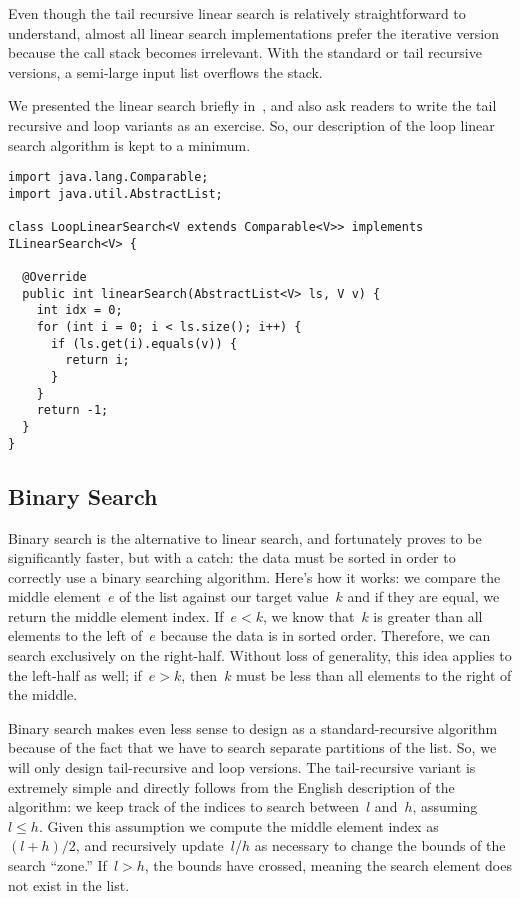 Even though the tail recursive linear search is relatively straightforward to understand, almost all linear search implementations prefer the iterative version because the call stack becomes irrelevant.
With the standard or tail recursive versions, a semi-large input list overflows the stack.

We presented the linear search briefly in~, and also ask readers to write the tail recursive and loop variants as an exercise.
So, our description of the loop linear search algorithm is kept to a minimum.

\begin{lstlisting}[language=MyJava]
import java.lang.Comparable;
import java.util.AbstractList;

class LoopLinearSearch<V extends Comparable<V>> implements ILinearSearch<V> {

  @Override
  public int linearSearch(AbstractList<V> ls, V v) {
    int idx = 0;
    for (int i = 0; i < ls.size(); i++) {
      if (ls.get(i).equals(v)) { 
        return i;
      }
    }
    return -1;
  }
}
\end{lstlisting}

\subsection{Binary Search}

Binary search is the alternative to linear search, and fortunately proves to be significantly faster, but with a catch: the data must be sorted in order to correctly use a binary searching algorithm. 
Here's how it works: we compare the middle element~$e$ of the list against our target value~$k$ and if they are equal, we return the middle element index. 
If~$e < k$, we know that~$k$ is greater than all elements to the left of~$e$ because the data is in sorted order. 
Therefore, we can search exclusively on the right-half. 
Without loss of generality, this idea applies to the left-half as well; if~$e > k$, then~$k$ must be less than all elements to the right of the middle. 

Binary search makes even less sense to design as a standard-recursive algorithm because of the fact that we have to search separate partitions of the list. 
So, we will only design tail-recursive and loop versions. 
The tail-recursive variant is extremely simple and directly follows from the English description of the algorithm: we keep track of the indices to search between~$l$ and~$h$, assuming~$l \leq h$. 
Given this assumption we compute the middle element index as~$(l + h) / 2$, and recursively update~$l$/$h$ as necessary to change the bounds of the search ``zone.'' 
If~$l > h$, the bounds have crossed, meaning the search element does not exist in the list. 

